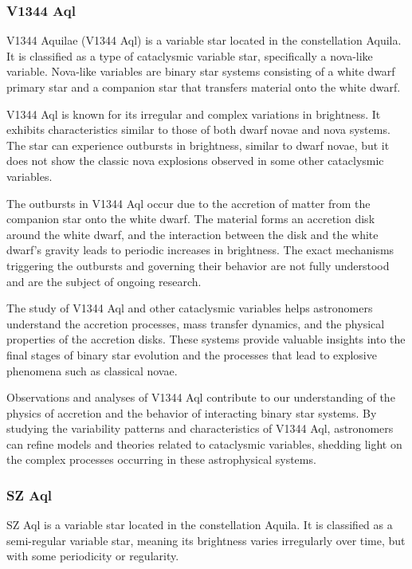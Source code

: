 \subsubsection*{ V1344 Aql }
V1344 Aquilae (V1344 Aql) is a variable star located in the constellation Aquila. It is classified as a type of cataclysmic variable star, specifically a nova-like variable. Nova-like variables are binary star systems consisting of a white dwarf primary star and a companion star that transfers material onto the white dwarf.

V1344 Aql is known for its irregular and complex variations in brightness. It exhibits characteristics similar to those of both dwarf novae and nova systems. The star can experience outbursts in brightness, similar to dwarf novae, but it does not show the classic nova explosions observed in some other cataclysmic variables.

The outbursts in V1344 Aql occur due to the accretion of matter from the companion star onto the white dwarf. The material forms an accretion disk around the white dwarf, and the interaction between the disk and the white dwarf's gravity leads to periodic increases in brightness. The exact mechanisms triggering the outbursts and governing their behavior are not fully understood and are the subject of ongoing research.

The study of V1344 Aql and other cataclysmic variables helps astronomers understand the accretion processes, mass transfer dynamics, and the physical properties of the accretion disks. These systems provide valuable insights into the final stages of binary star evolution and the processes that lead to explosive phenomena such as classical novae.

Observations and analyses of V1344 Aql contribute to our understanding of the physics of accretion and the behavior of interacting binary star systems. By studying the variability patterns and characteristics of V1344 Aql, astronomers can refine models and theories related to cataclysmic variables, shedding light on the complex processes occurring in these astrophysical systems.

\subsubsection*{ SZ Aql }
SZ Aql is a variable star located in the constellation Aquila. It is classified as a semi-regular variable star, meaning its brightness varies irregularly over time, but with some periodicity or regularity.


